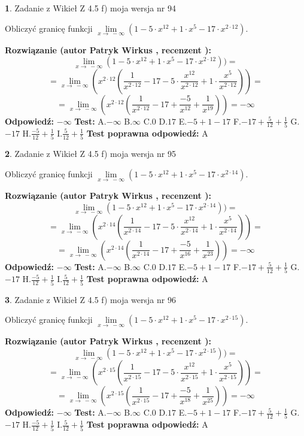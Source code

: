 \documentclass[12pt, a4paper]{article}
\theoremstyle{definition} %
\newtheorem{zad}{}
\newcommand{\zadStart}[1]{\begin{zad}#1\newline}
\newcommand{\zadStop}{\end{zad}}
\newcommand{\rozwStart}[2]{\noindent \textbf{Rozwiązanie (autor #1 , recenzent #2): }\newline}
\newcommand{\rozwStop}{\newline}
\newcommand{\odpStart}{\noindent \textbf{Odpowiedź:}\newline}
\newcommand{\odpStop}{\newline}
\newcommand{\testStart}{\noindent \textbf{Test:}\newline}
\newcommand{\testStop}{\newline}
\newcommand{\kluczStart}{\noindent \textbf{Test poprawna odpowiedź:}\newline}
\newcommand{\kluczStop}{\newline}
\begin{document}
\zadStart{Zadanie z Wikieł Z 4.5 f) moja wersja nr 94}



Obliczyć granicę funkcji  $\lim\limits_{x\to\ -\infty}(1 - 5 \cdot x^{12}+1 \cdot x^{5}- 17 \cdot x^{2\cdot12})$.
\zadStop
\rozwStart{Patryk Wirkus}{}
$$\lim\limits_{x\to\ -\infty}(1 - 5 \cdot x^{12}+1 \cdot x^{5}- 17 \cdot x^{2\cdot12}))=$$
$$=\lim\limits_{x\to\ -\infty}(x^{2\cdot12}(\frac{1}{x^{2\cdot12}}-17 -5 \cdot \frac{x^{12}}{x^{2\cdot12}}+1 \cdot \frac{x^{5}}{x^{2\cdot12}}))=$$
$$=\lim\limits_{x\to\ -\infty}(x^{2\cdot12}(\frac{1}{x^{2\cdot12}}-17 + \frac{-5}{x^{12}}+ \frac{1}{x^{19}}))=-\infty$$
\rozwStop
\odpStart
$-\infty$
\odpStop
\testStart
A.$-\infty$ B.$\infty$ C.$0$ D.$17$ E.$-5 + 1 - 17$
F.$-17+\frac{5}{12}+\frac{1}{5}$ G.$-17$
H.$\frac{-5}{12}+\frac{1}{5}$
I.$\frac{5}{12}+\frac{1}{5}$
\testStop
\kluczStart
A
\kluczStop



\zadStart{Zadanie z Wikieł Z 4.5 f) moja wersja nr 95}



Obliczyć granicę funkcji  $\lim\limits_{x\to\ -\infty}(1 - 5 \cdot x^{12}+1 \cdot x^{5}- 17 \cdot x^{2\cdot14})$.
\zadStop
\rozwStart{Patryk Wirkus}{}
$$\lim\limits_{x\to\ -\infty}(1 - 5 \cdot x^{12}+1 \cdot x^{5}- 17 \cdot x^{2\cdot14}))=$$
$$=\lim\limits_{x\to\ -\infty}(x^{2\cdot14}(\frac{1}{x^{2\cdot14}}-17 -5 \cdot \frac{x^{12}}{x^{2\cdot14}}+1 \cdot \frac{x^{5}}{x^{2\cdot14}}))=$$
$$=\lim\limits_{x\to\ -\infty}(x^{2\cdot14}(\frac{1}{x^{2\cdot14}}-17 + \frac{-5}{x^{16}}+ \frac{1}{x^{23}}))=-\infty$$
\rozwStop
\odpStart
$-\infty$
\odpStop
\testStart
A.$-\infty$ B.$\infty$ C.$0$ D.$17$ E.$-5 + 1 - 17$
F.$-17+\frac{5}{12}+\frac{1}{5}$ G.$-17$
H.$\frac{-5}{12}+\frac{1}{5}$
I.$\frac{5}{12}+\frac{1}{5}$
\testStop
\kluczStart
A
\kluczStop



\zadStart{Zadanie z Wikieł Z 4.5 f) moja wersja nr 96}



Obliczyć granicę funkcji  $\lim\limits_{x\to\ -\infty}(1 - 5 \cdot x^{12}+1 \cdot x^{5}- 17 \cdot x^{2\cdot15})$.
\zadStop
\rozwStart{Patryk Wirkus}{}
$$\lim\limits_{x\to\ -\infty}(1 - 5 \cdot x^{12}+1 \cdot x^{5}- 17 \cdot x^{2\cdot15}))=$$
$$=\lim\limits_{x\to\ -\infty}(x^{2\cdot15}(\frac{1}{x^{2\cdot15}}-17 -5 \cdot \frac{x^{12}}{x^{2\cdot15}}+1 \cdot \frac{x^{5}}{x^{2\cdot15}}))=$$
$$=\lim\limits_{x\to\ -\infty}(x^{2\cdot15}(\frac{1}{x^{2\cdot15}}-17 + \frac{-5}{x^{18}}+ \frac{1}{x^{25}}))=-\infty$$
\rozwStop
\odpStart
$-\infty$
\odpStop
\testStart
A.$-\infty$ B.$\infty$ C.$0$ D.$17$ E.$-5 + 1 - 17$
F.$-17+\frac{5}{12}+\frac{1}{5}$ G.$-17$
H.$\frac{-5}{12}+\frac{1}{5}$
I.$\frac{5}{12}+\frac{1}{5}$
\testStop
\kluczStart
A
\kluczStop
\end{document}
